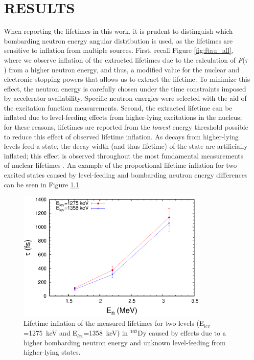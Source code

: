 \chapter{RESULTS}\label{sec:lifetime_inflation}
When reporting the lifetimes in this work, it is prudent to distinguish which bombarding neutron energy angular distribution is used, as the lifetimes are sensitive to inflation from multiple sources. First, recall Figure \ref{fig:ftau_all}, where we observe inflation of the extracted lifetimes due to the calculation of \textit{F}($\tau$) from a higher neutron energy, and thus, a modified value for the nuclear and electronic stopping powers that allows us to extract the lifetime. To minimize this effect, the neutron energy is carefully chosen under the time constraints imposed by accelerator availability. Specific neutron energies were selected with the aid of the excitation function measurements. Second, the extracted lifetime can be inflated due to level-feeding effects from higher-lying excitations in the nucleus; for these reasons, lifetimes are reported from the \textit{lowest} energy threshold possible to reduce this effect of observed lifetime inflation. As decays from higher-lying levels feed a state, the decay width (and thus lifetime) of the state are artificially inflated; this effect is observed throughout the most fundamental measurements of nuclear lifetimes \cite{Casten_text,Wong_text}. An example of the proportional lifetime inflation for two excited states caused by level-feeding and bombarding neutron energy differences can be seen in Figure \ref{fig:lifetime_inflation}. 

\begin{figure}[h!]
\begin{center}
\includegraphics[width=0.85\textwidth]{lifetime_inflation_example.eps}
\caption{Lifetime inflation of the measured lifetimes for two levels (E$_{lev}$=1275~keV and E$_{lev}$=1358~keV) in $^{162}$Dy caused by effects due to a higher bombarding neutron energy and unknown level-feeding from higher-lying states. \label{fig:lifetime_inflation}}
\end{center}
\end{figure}

